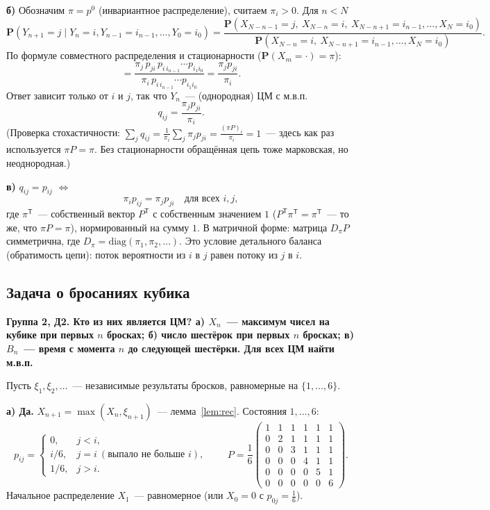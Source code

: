 \documentclass[11pt,a4paper]{article}
\theoremstyle{definition}
\newcommand{\PP}{\mathbf P}
\newcommand{\1}{\mathbf 1}
\newenvironment{task}[1]{\par\medskip\noindent\colorbox{black!7}{\parbox{\dimexpr\linewidth-2\fboxsep}{\textbf{#1}}}\par\smallskip}{\par}
\begin{document}
\textbf{б)} Обозначим $\pi=p^0$ (инвариантное распределение), считаем $\pi_i>0$.
Для $n<N$
\[
\PP(Y_{n+1}=j\mid Y_n=i,Y_{n-1}=i_{n-1},\dots,Y_0=i_0)
=\frac{\PP(X_{N-n-1}=j,\ X_{N-n}=i,\ X_{N-n+1}=i_{n-1},\dots,X_N=i_0)}
{\PP(X_{N-n}=i,\ X_{N-n+1}=i_{n-1},\dots,X_N=i_0)} .
\]
По формуле совместного распределения и стационарности
($\PP(X_m=\cdot)=\pi$):
\[
=\frac{\pi_j\,p_{ji}\,p_{i\,i_{n-1}}\cdots p_{i_1i_0}}{\pi_i\,p_{i\,i_{n-1}}\cdots p_{i_1i_0}}
=\frac{\pi_jp_{ji}}{\pi_i}.
\]
Ответ зависит только от $i$ и $j$, так что $Y_n$~--- (однородная) ЦМ с м.в.п.
\[
q_{ij}=\frac{\pi_jp_{ji}}{\pi_i}.
\]
(Проверка стохастичности:
$\sum_jq_{ij}=\frac{1}{\pi_i}\sum_j\pi_jp_{ji}=\frac{(\pi P)_i}{\pi_i}=1$~---
здесь как раз используется $\pi P=\pi$. Без стационарности обращённая цепь
тоже марковская, но неоднородная.)

\textbf{в)} $q_{ij}=p_{ij}$ $\iff$
\[
\boxed{\pi_ip_{ij}=\pi_jp_{ji}\quad\text{для всех }i,j,}
\]
где $\pi^{\mathsf T}$~--- собственный вектор $P^{\mathsf T}$ с собственным
значением $1$ ($P^{\mathsf T}\pi^{\mathsf T}=\pi^{\mathsf T}$~--- то же, что $\pi P=\pi$),
нормированный на сумму $1$. В матричной форме: матрица $D_\pi P$ симметрична,
где $D_\pi=\mathrm{diag}(\pi_1,\pi_2,\dots)$. Это условие детального баланса
(обратимость цепи): поток вероятности из $i$ в $j$ равен потоку из $j$ в $i$.

\subsection{Задача о бросаниях кубика}\label{z:dice}

\begin{task}{Группа 2, Д2. Кто из них является ЦМ? а) $X_n$~--- максимум чисел на
кубике при первых $n$ бросках; б) число шестёрок при первых $n$ бросках;
в) $B_n$~--- время с момента $n$ до следующей шестёрки. Для всех ЦМ найти м.в.п.}
\end{task}
Пусть $\xi_1,\xi_2,\dots$~--- независимые результаты бросков, равномерные на
$\{1,\dots,6\}$.

\textbf{а) Да.} $X_{n+1}=\max(X_n,\xi_{n+1})$~--- лемма~\ref{lem:rec}.
Состояния $1,\dots,6$:
\[
p_{ij}=\begin{cases}0,&j<i,\\ i/6,&j=i\ (\text{выпало не больше }i),\\ 1/6,&j>i.\end{cases}
\qquad
P=\frac16\begin{pmatrix}
1&1&1&1&1&1\\0&2&1&1&1&1\\0&0&3&1&1&1\\0&0&0&4&1&1\\0&0&0&0&5&1\\0&0&0&0&0&6
\end{pmatrix}.
\]
Начальное распределение $X_1$~--- равномерное (или $X_0=0$ с $p_{0j}=\frac16$).
\end{document}
